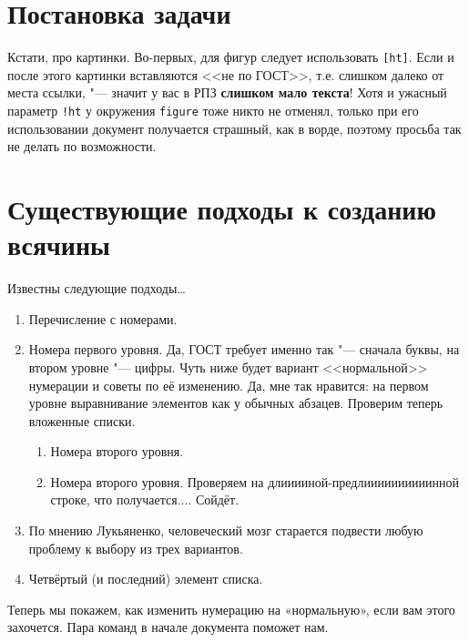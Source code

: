 \section{Постановка задачи}
\label{sec:problem}

Кстати, про картинки. Во-первых, для фигур следует использовать \texttt{[ht]}. Если и после этого картинки вставляются <<не по ГОСТ>>, т.е. слишком далеко от места ссылки, "--- значит у вас в РПЗ \textbf{слишком мало текста}! Хотя и ужасный параметр \texttt{!ht} у окружения \texttt{figure} тоже никто не отменял, только при его использовании документ получается страшный, как в ворде, поэтому просьба так не делать по возможности.

\section{}

\section{Существующие подходы к созданию всячины}

Известны следующие подходы\ldots

\begin{enumerate}
  \item Перечисление с номерами.
  \item Номера первого уровня.
  Да, ГОСТ требует именно так "--- сначала буквы, на втором уровне "--- цифры.
  Чуть ниже будет вариант <<нормальной>> нумерации и советы по её изменению.
  Да, мне так нравится: на первом уровне выравнивание элементов как у обычных абзацев.
  Проверим теперь вложенные списки.
  \begin{enumerate}
    \item Номера второго уровня.
    \item Номера второго уровня.
    Проверяем на длииииной-предлиииииииииинной строке, что получается.... Сойдёт.
  \end{enumerate}
  \item По мнению Лукьяненко, человеческий мозг старается подвести любую проблему к выбору
  из трех вариантов.
  \item Четвёртый (и последний) элемент списка.
\end{enumerate}

Теперь мы покажем, как изменить нумерацию на «нормальную», если вам этого захочется.
Пара команд в начале документа поможет нам.

\renewcommand{\labelenumi}{\arabic{enumi})}
\renewcommand{\labelenumii}{\asbuk{enumii})}

